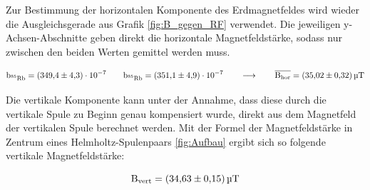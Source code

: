         Zur Bestimmung der horizontalen Komponente des Erdmagnetfeldes wird wieder die Ausgleichsgerade aus Grafik \autoref{fig:B_gegen_RF} verwendet. Die jeweiligen y-Achsen-Abschnitte geben direkt die 
        horizontale Magnetfeldstärke, sodass nur zwischen den beiden Werten gemittel werden muss.
        
        \begin{equation*}
            \text{b}_{\text{${}^{85}$Rb}}= \num{349.4\pm4.3 e-7} \qquad \text{b}_{\text{${}^{85}$Rb}}= \num{351.1\pm4.9 e-7} \qquad \longrightarrow \qquad  \overline{\text{B}_{\text{hor}}} = \SI{35.02 +- 0.32}{\micro\tesla}
        \end{equation*}
    
        \noindent

        Die vertikale Komponente kann unter der Annahme, dass diese durch die vertikale Spule zu Beginn genau kompensiert wurde, direkt aus dem Magnetfeld der vertikalen Spule berechnet werden. Mit der Formel
        der Magnetfeldstärke in Zentrum eines Helmholtz-Spulenpaars \ref{fig:Aufbau} ergibt sich so folgende vertikale Magnetfeldstärke:

        \begin{equation*}
            \text{B}_{\text{vert}} = \SI{34.63 +- 0.15}{\micro\tesla}
        \end{equation*}

